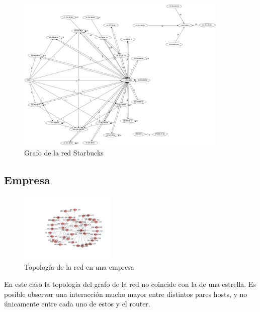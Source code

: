 ~

\begin{figure}[H]
	\center
	\includegraphics[width=0.9\textwidth]{resultados/starbucks/starbucks.png}
	\caption{Grafo de la red Starbucks}
\end{figure}
	

\subsection{Empresa}

\begin{figure}
\vspace{-35pt}
\hspace{-35pt}
\centering
   \includegraphics[width=0.4\textwidth]{resultados/empresa/conectividadNX.pdf}
\vspace{-30pt}
   \caption{Topología de la red en una empresa}
\end{figure}

En este caso la topología del grafo de la red no coincide con la de una estrella. Es posible observar una interacción mucho mayor entre distintos pares hosts, y no únicamente
entre cada uno de estos y el router.

